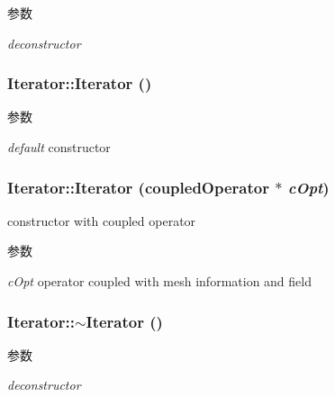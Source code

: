\begin{DoxyParams}{参数}
\item[{\em deconstructor}]\end{DoxyParams}
\hypertarget{classIterator_a30f4489aebb0ea1a56da6925d03eecfb}{
\subsubsection[{Iterator}]{\setlength{\rightskip}{0pt plus 5cm}Iterator::Iterator ()}}
\label{classIterator_a30f4489aebb0ea1a56da6925d03eecfb}

\begin{DoxyParams}{参数}
\item[{\em default}]constructor \end{DoxyParams}
\hypertarget{classIterator_aef11e42fab332c1ef29187d4c7ab2b6c}{
\subsubsection[{Iterator}]{\setlength{\rightskip}{0pt plus 5cm}Iterator::Iterator (coupledOperator $\ast$ {\em cOpt})}}
\label{classIterator_aef11e42fab332c1ef29187d4c7ab2b6c}


constructor with coupled operator 
\begin{DoxyParams}{参数}
\item[{\em cOpt}]operator coupled with mesh information and field \end{DoxyParams}
\hypertarget{classIterator_aab6716f5bdecb49e9cdd754359408ab6}{
\subsubsection[{$\sim$Iterator}]{\setlength{\rightskip}{0pt plus 5cm}Iterator::$\sim$Iterator ()}}
\label{classIterator_aab6716f5bdecb49e9cdd754359408ab6}

\begin{DoxyParams}{参数}
\item[{\em deconstructor}]\end{DoxyParams}


